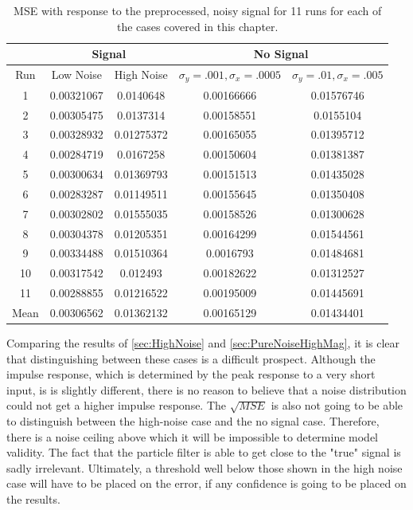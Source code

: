 \begin{table}[t]
\centering
\begin{tabular}{|c | c | c | c | c |}
\hline 
& \multicolumn{2}{|c|}{Signal} & \multicolumn{2}{|c|}{No Signal}\\
\hline
Run  & Low Noise & High Noise & $\sigma_y=.001, \sigma_x=.0005$ & $\sigma_y=.01, \sigma_x=.005$\\
\hline 
\hline       
1 &   0.00321067 & 0.0140648  &   0.00166666 &  0.01576746 \\
2 &   0.00305475 & 0.0137314  &   0.00158551 &  0.0155104 \\
3 &   0.00328932 & 0.01275372  &  0.00165055 &  0.01395712 \\
4 &   0.00284719 & 0.0167258  &   0.00150604 &  0.01381387 \\
5 &   0.00300634 & 0.01369793  &  0.00151513 &  0.01435028 \\
6 &   0.00283287 & 0.01149511  &  0.00155645 &  0.01350408 \\
7 &   0.00302802 & 0.01555035  &  0.00158526 &  0.01300628 \\
8 &   0.00304378 & 0.01205351  &  0.00164299 &  0.01544561 \\
9 &   0.00334488 & 0.01510364  &  0.0016793 &   0.01484681 \\
10 &  0.00317542 & 0.012493  &    0.00182622 &  0.01312527 \\
11 &  0.00288855 & 0.01216522  &  0.00195009 &  0.01445691 \\
\hline
Mean& 0.00306562 & 0.01362132  &  0.00165129 &  0.01434401 \\
\hline
\end{tabular}
\caption{MSE with response to the preprocessed, noisy signal for 11 runs for each of the cases covered in this chapter.}
\label{tab:SingleVoxelMSEComparison} 
\end{table}

Comparing the results of \autoref{sec:HighNoise} and \autoref{sec:PureNoiseHighMag}, it is
clear that distinguishing between these cases is a difficult prospect. Although
the impulse response, which is determined by the peak response to a very short input,
is is slightly different, there is no reason to believe that a noise distribution
could not get a higher impulse response. The $\sqrt{MSE}$ is also not going to be
able to distinguish between the high-noise case and the no signal case. Therefore, there
is a noise ceiling above which it will be impossible to determine model validity. The fact
that the particle filter is able to get close to the "true" signal is sadly irrelevant.
Ultimately, a threshold well below those shown in the high noise case 
will have to be placed on the error, if any confidence is going to be placed on the results.


